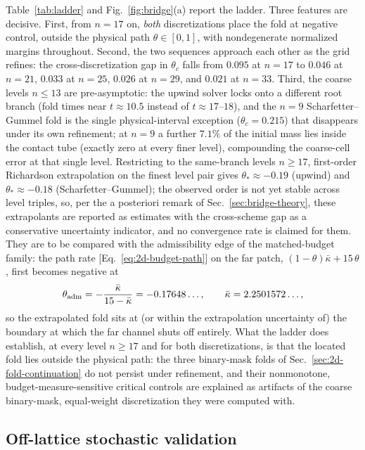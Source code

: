 \documentclass[aps,pre,reprint,amsmath,amssymb,longbibliography,floatfix]{revtex4-2}
\begin{document}
Table~\ref{tab:ladder} and Fig.~\ref{fig:bridge}(a) report the ladder. Three features are decisive.
First, from \(n=17\) on, \emph{both} discretizations place the fold at
negative control, outside the physical path \(\theta\in[0,1]\), with
nondegenerate normalized margins throughout. Second, the two sequences
approach each other as the grid refines: the cross-discretization gap in
\(\theta_c\) falls from \(0.095\) at \(n=17\) to \(0.046\) at \(n=21\),
\(0.033\) at \(n=25\), \(0.026\) at \(n=29\), and \(0.021\) at
\(n=33\). Third, the coarse levels
\(n\le13\) are pre-asymptotic: the upwind solver locks onto a different
root branch (fold times near \(t\approx10.5\) instead of
\(t\approx17\)--\(18\)), and the \(n=9\) Scharfetter--Gummel fold is the
single physical-interval exception (\(\theta_c=0.215\)) that disappears
under its own refinement; at \(n=9\) a further \(7.1\%\) of the initial
mass lies inside the contact tube (exactly zero at every finer level),
compounding the coarse-cell error at that single level.
Restricting to the same-branch levels \(n\ge17\), first-order Richardson
extrapolation on the finest level pair gives \(\theta_*\approx-0.19\)
(upwind) and \(\theta_*\approx-0.18\) (Scharfetter--Gummel); the observed
order is not yet stable across level triples, so, per the a posteriori
remark of Sec.~\ref{sec:bridge-theory}, these extrapolants are reported as
estimates with the cross-scheme gap as a conservative uncertainty
indicator, and no convergence rate is claimed for them. They are to be compared with the
admissibility edge of the matched-budget family: the path rate
[Eq.~\eqref{eq:2d-budget-path}] on the far
patch, \((1-\theta)\bar\kappa+15\,\theta\), first becomes negative at
\begin{equation}
\theta_{\rm adm}
=-\frac{\bar\kappa}{15-\bar\kappa}
=-0.17648\ldots,
\qquad \bar\kappa=2.2501572\ldots,
\label{eq:theta-adm}
\end{equation}
so the extrapolated fold sits at (or within the extrapolation uncertainty
of) the boundary at which the far channel shuts off entirely. What the
ladder does establish, at every level \(n\ge17\) and for both
discretizations, is that the located fold lies outside the physical path:
the three binary-mask folds of Sec.~\ref{sec:2d-fold-continuation} do not
persist under refinement, and their nonmonotone, budget-measure-sensitive
critical controls are explained as artifacts of the coarse binary-mask,
equal-weight discretization they were computed with.

\subsection{Off-lattice stochastic validation}
\label{sec:offlattice}
\end{document}
